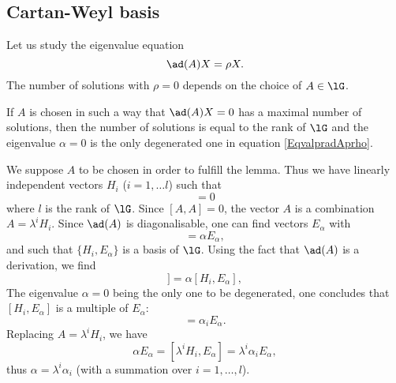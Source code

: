                     \subsection{Cartan-Weyl basis}

Let us study the eigenvalue equation
\begin{equation}        \label{EqvalpradAprho}
    \ad(A)X=\rho X.
\end{equation}
The number of solutions with $\rho=0$ depends on the choice of $A\in\lG$.

\begin{lemma}
    If $A$ is chosen in such a way that $\ad(A)X=0$ has a maximal number of solutions, then the number of solutions is equal to the rank of $\lG$ and the eigenvalue $\alpha=0$ is the only degenerated one in equation \eqref{EqvalpradAprho}.
\end{lemma}

We suppose $A$ to be chosen in order to fulfill the lemma. Thus we have linearly independent vectors $H_i$ ($i=1,\ldots l$) such that
\begin{equation}
    [A,H_i]=0
\end{equation}
where $l$ is the rank of $\lG$. Since $[A,A]=0$, the vector $A$ is a combination $A=\lambda^iH_i$. Since $\ad(A)$ is diagonalisable, one can find vectors $E_{\alpha}$ with
\begin{equation}
    [A,E_{\alpha}]=\alpha E_{\alpha},
\end{equation}
and such that $\{ H_i,E_{\alpha} \}$ is a basis of $\lG$. Using the fact that $\ad(A)$ is a derivation, we find
\begin{equation}
    [A,[H_i,E_{\alpha}]]=\alpha[H_i,E_{\alpha}],
\end{equation}
The eigenvalue $\alpha=0$ being the only one to be degenerated, one concludes that $[H_i,E_{\alpha}]$ is a multiple of $E_{\alpha}$:
\begin{equation}
    [H_i,E_{\alpha}]=\alpha_i E_{\alpha}.
\end{equation}
Replacing $A=\lambda^iH_i$, we have
\begin{equation}
    \alpha E_{\alpha}=[\lambda^iH_i,E_{\alpha}]=\lambda^i\alpha_iE_{\alpha},
\end{equation}
thus $\alpha=\lambda^i\alpha_i$ (with a summation over $i=1,\ldots,l$).

